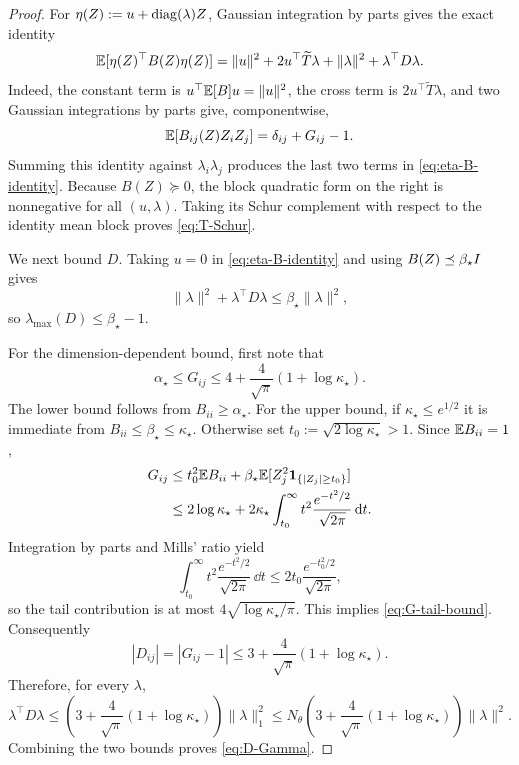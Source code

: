 \begin{proof}
For $\eta(Z):=u+\operatorname{diag}(\lambda)Z$, Gaussian integration by parts gives the exact identity
\begin{equation}
\label{eq:eta-B-identity}
    \mathbb{E}[\eta(Z)^\top B(Z)\eta(Z)]
    =\|u\|^2+2u^\top\widetilde T\lambda+\|\lambda\|^2+\lambda^\top D\lambda.
\end{equation}
Indeed, the constant term is $u^\top\mathbb{E}[B]u=\|u\|^2$, the cross term is
$2u^\top\widetilde T\lambda$, and two Gaussian integrations by parts give, componentwise,
\[
    \mathbb{E}[B_{ij}(Z)Z_iZ_j]=\delta_{ij}+G_{ij}-1.
\]
Summing this identity against $\lambda_i\lambda_j$ produces the last two terms in
\eqref{eq:eta-B-identity}.
Because $B(Z)\succeq0$, the block quadratic form on the right is nonnegative for all
$(u,\lambda)$.  Taking its Schur complement with respect to the identity mean block proves
\eqref{eq:T-Schur}.

We next bound $D$.  Taking $u=0$ in \eqref{eq:eta-B-identity} and using
$B(Z)\preceq\beta_\star I$ gives
\[
    \|\lambda\|^2+\lambda^\top D\lambda
    \leq\beta_\star\|\lambda\|^2,
\]
so $\lambda_{\max}(D)\leq\beta_\star-1$.

For the dimension-dependent bound, first note that
\begin{equation}
\label{eq:G-tail-bound}
    \alpha_\star\leq G_{ij}
    \leq 4+\frac4{\sqrt\pi}(1+\log\kappa_\star).
\end{equation}
The lower bound follows from $B_{ii}\geq\alpha_\star$.  For the upper bound, if
$\kappa_\star\leq e^{1/2}$ it is immediate from
$B_{ii}\leq\beta_\star\leq\kappa_\star$.  Otherwise set
$t_0:=\sqrt{2\log\kappa_\star}>1$.  Since $\mathbb{E} B_{ii}=1$,
\[
\begin{aligned}
    G_{ij}
    &\leq
    t_0^2\mathbb{E} B_{ii}
    +\beta_\star\mathbb{E}[Z_j^2\mathbf 1_{\{|Z_j|\geq t_0\}}]\\
    &\leq
    2\log\kappa_\star
    +2\kappa_\star\int_{t_0}^{\infty}t^2\frac{e^{-t^2/2}}{\sqrt{2\pi}}\,\mathrm{d} t.
\end{aligned}
\]
Integration by parts and Mills' ratio yield
\[
    \int_{t_0}^{\infty}t^2\frac{e^{-t^2/2}}{\sqrt{2\pi}}\,\dd t
    \leq2t_0\frac{e^{-t_0^2/2}}{\sqrt{2\pi}},
\]
so the tail contribution is at most
$4\sqrt{\log\kappa_\star/\pi}$.  This implies \eqref{eq:G-tail-bound}.
Consequently
\[
    |D_{ij}|=|G_{ij}-1|
    \leq3+\frac4{\sqrt\pi}(1+\log\kappa_\star).
\]
Therefore, for every $\lambda$,
\[
    \lambda^\top D\lambda
    \leq
    \left(3+\frac4{\sqrt\pi}(1+\log\kappa_\star)\right)\|\lambda\|_1^2
    \leq
    N_\theta\left(3+\frac4{\sqrt\pi}(1+\log\kappa_\star)\right)\|\lambda\|^2.
\]
Combining the two bounds proves \eqref{eq:D-Gamma}.
\end{proof}

